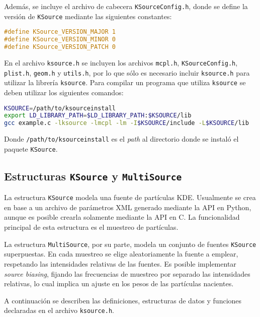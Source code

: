 Además, se incluye el archivo de cabecera \verb|KSourceConfig.h|, donde se define la versión de \verb|KSource| mediante las siguientes constantes:
\begin{lstlisting}[language=C]
#define KSource_VERSION_MAJOR 1
#define KSource_VERSION_MINOR 0
#define KSource_VERSION_PATCH 0
\end{lstlisting}

En el archivo \verb|ksource.h| se incluyen los archivos \verb|mcpl.h|, \verb|KSourceConfig.h|, \verb|plist.h|, \verb|geom.h| y \verb|utils.h|, por lo que sólo es necesario incluir \verb|ksource.h| para utilizar la librería \verb|ksource|. Para compilar un programa que utiliza \verb|ksource| se deben utilizar los siguientes comandos:
\begin{lstlisting}[language=bash]
KSOURCE=/path/to/ksourceinstall
export LD_LIBRARY_PATH=$LD_LIBRARY_PATH:$KSOURCE/lib
gcc example.c -lksource -lmcpl -lm -I$KSOURCE/include -L$KSOURCE/lib
\end{lstlisting}
Donde \verb|/path/to/ksourceinstall| es el \emph{path} al directorio donde se instaló el paquete \verb|KSource|.


\subsection{Estructuras \texttt{KSource} y \texttt{MultiSource}}

La estructura \verb|KSource| modela una fuente de partículas KDE. Usualmente se crea en base a un archivo de parámetros XML generado mediante la API en Python, aunque es posible crearla solamente mediante la API en C. La funcionalidad principal de esta estructura es el muestreo de partículas.

La estructura \verb|MultiSource|, por su parte, modela un conjunto de fuentes \verb|KSource| superpuestas. En cada muestreo se elige aleatoriamente la fuente a emplear, respetando las intensidades relativas de las fuentes. Es posible implementar \emph{source biasing}, fijando las frecuencias de muestreo por separado las intensidades relativas, lo cual implica un ajuste en los pesos de las partículas nacientes.

A continuación se describen las definiciones, estructuras de datos y funciones declaradas en el archivo \verb|ksource.h|.

